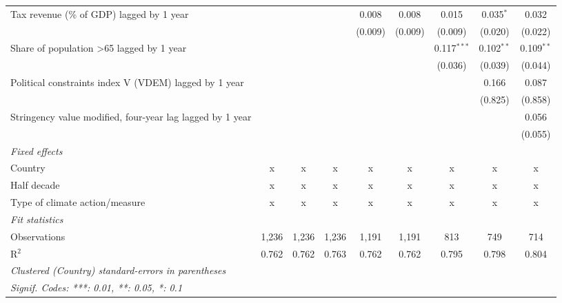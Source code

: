 \begin{tabular}{lcccccccc}
   Tax revenue (\% of GDP) lagged by 1 year                       &         &         &         & 0.008   & 0.008   & 0.015         & 0.035$^{*}$  & 0.032\\   
                                                                  &         &         &         & (0.009) & (0.009) & (0.009)       & (0.020)      & (0.022)\\   
   Share of population >65 lagged by 1 year                       &         &         &         &         &         & 0.117$^{***}$ & 0.102$^{**}$ & 0.109$^{**}$\\   
                                                                  &         &         &         &         &         & (0.036)       & (0.039)      & (0.044)\\   
   Political constraints index V (VDEM) lagged by 1 year          &         &         &         &         &         &               & 0.166        & 0.087\\   
                                                                  &         &         &         &         &         &               & (0.825)      & (0.858)\\   
   Stringency value modified, four-year lag lagged by 1 year      &         &         &         &         &         &               &              & 0.056\\   
                                                                  &         &         &         &         &         &               &              & (0.055)\\   
   \emph{Fixed effects}\\
   Country                                                        & x       & x       & x       & x       & x       & x             & x            & x\\  
   Half decade                                                    & x       & x       & x       & x       & x       & x             & x            & x\\  
   Type of climate action/measure                                 & x       & x       & x       & x       & x       & x             & x            & x\\  
   \midrule \emph{Fit statistics}\\
   Observations                                                   & 1,236   & 1,236   & 1,236   & 1,191   & 1,191   & 813           & 749          & 714\\  
   R$^2$                                                          & 0.762   & 0.762   & 0.763   & 0.762   & 0.762   & 0.795         & 0.798        & 0.804\\  
   \midrule
   \multicolumn{9}{l}{\emph{Clustered (Country) standard-errors in parentheses}}\\
   \multicolumn{9}{l}{\emph{Signif. Codes: ***: 0.01, **: 0.05, *: 0.1}}\\
\end{tabular}
\par\endgroup


